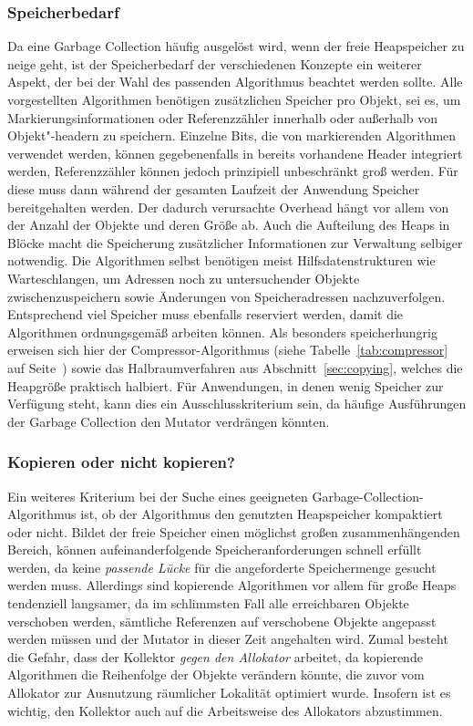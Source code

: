 

\subsubsection*{Speicherbedarf}
Da eine Garbage Collection häufig ausgelöst wird, wenn der freie Heapspeicher zu neige geht, ist der Speicherbedarf der verschiedenen Konzepte ein weiterer Aspekt, der bei der Wahl des passenden Algorithmus beachtet werden sollte.
Alle vorgestellten Algorithmen benötigen zusätzlichen Speicher pro Objekt, sei es, um Markierungsinformationen oder Referenzzähler innerhalb oder außerhalb von Objekt"-headern zu speichern.
Einzelne Bits, die von markierenden Algorithmen verwendet werden, können gegebenenfalls in bereits vorhandene Header integriert werden, Referenzzähler können jedoch prinzipiell unbeschränkt groß werden.
Für diese muss dann während der gesamten Laufzeit der Anwendung Speicher bereitgehalten werden.
Der dadurch verursachte Overhead hängt vor allem von der Anzahl der Objekte und deren Größe ab.
Auch die Aufteilung des Heaps in Blöcke macht die Speicherung zusätzlicher Informationen zur Verwaltung selbiger notwendig.
Die Algorithmen selbst benötigen meist Hilfsdatenstrukturen wie Warteschlangen, um Adressen noch zu untersuchender Objekte zwischenzuspeichern sowie Änderungen von Speicheradressen nachzuverfolgen.
Entsprechend viel Speicher muss ebenfalls reserviert werden, damit die Algorithmen ordnungsgemäß arbeiten können.
Als besonders speicherhungrig erweisen sich hier der Compressor-Algorithmus (siehe Tabelle~\ref{tab:compressor} auf Seite~\pageref{tab:compressor}) sowie das Halbraumverfahren aus Abschnitt~\ref{sec:copying}, welches die Heapgröße praktisch halbiert.
Für Anwendungen, in denen wenig Speicher zur Verfügung steht, kann dies ein Ausschlusskriterium sein, da häufige Ausführungen der Garbage Collection den Mutator verdrängen könnten.




\subsubsection*{Kopieren oder nicht kopieren?}
Ein weiteres Kriterium bei der Suche eines geeigneten Garbage-Collection-Algorithmus ist, ob der Algorithmus den genutzten Heapspeicher kompaktiert oder nicht.
Bildet der freie Speicher einen möglichst großen zusammenhängenden Bereich, können aufeinanderfolgende Speicheranforderungen schnell erfüllt werden, da keine \textit{passende Lücke} für die angeforderte Speichermenge gesucht werden muss.
Allerdings sind kopierende Algorithmen vor allem für große Heaps tendenziell langsamer, da im schlimmsten Fall alle erreichbaren Objekte verschoben werden, sämtliche Referenzen auf verschobene Objekte angepasst werden müssen und der Mutator in dieser Zeit angehalten wird.
Zumal besteht die Gefahr, dass der Kollektor \textit{gegen den Allokator} arbeitet, da kopierende Algorithmen die Reihenfolge der Objekte verändern könnte, die zuvor vom Allokator zur Ausnutzung räumlicher Lokalität optimiert wurde.
Insofern ist es wichtig, den Kollektor auch auf die Arbeitsweise des Allokators abzustimmen.


